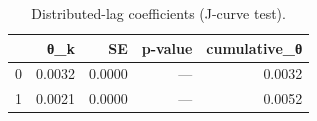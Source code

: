 \begin{table}[t]
\centering\small
\begin{tabular}{lrrrr}
\toprule
 & θ\_k & SE & p-value & cumulative\_θ \\
\midrule
0 & 0.0032 & 0.0000 & --- & 0.0032 \\
1 & 0.0021 & 0.0000 & --- & 0.0052 \\
\bottomrule
\end{tabular}
\caption{Distributed-lag coefficients (J-curve test).}
\label{tab:jcurve}
\end{table}